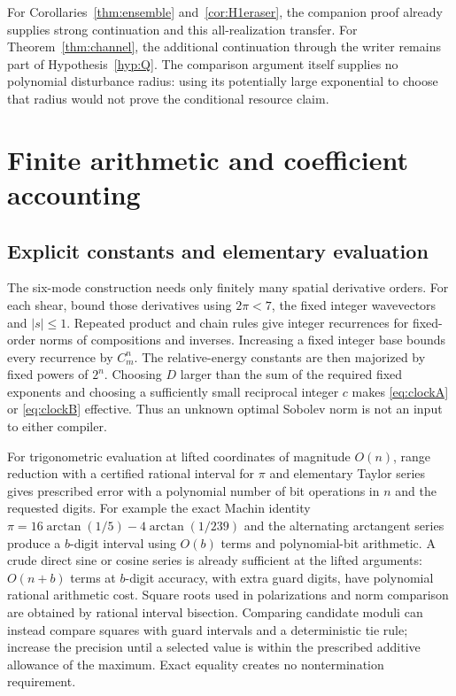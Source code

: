 \documentclass[11pt,a4paper]{amsart}
\theoremstyle{definition}
\theoremstyle{remark}
\numberwithin{equation}{section}
\begin{document}
For Corollaries~\ref{thm:ensemble} and~\ref{cor:H1eraser}, the companion proof already supplies strong continuation and this all-realization transfer. For Theorem~\ref{thm:channel}, the additional continuation through the writer remains part of Hypothesis~\ref{hyp:Q}. The comparison argument itself supplies no polynomial disturbance radius: using its potentially large exponential to choose that radius would not prove the conditional resource claim.



\section{Finite arithmetic and coefficient accounting}\label{app:computation}

\subsection{Explicit constants and elementary evaluation}
The six-mode construction needs only finitely many spatial derivative orders. For each shear, bound those derivatives using $2\pi<7$, the fixed integer wavevectors and $|s|\le1$. Repeated product and chain rules give integer recurrences for fixed-order norms of compositions and inverses. Increasing a fixed integer base bounds every recurrence by $C_m^n$. The relative-energy constants are then majorized by fixed powers of $2^n$. Choosing $D$ larger than the sum of the required fixed exponents and choosing a sufficiently small reciprocal integer $c$ makes \eqref{eq:clockA} or \eqref{eq:clockB} effective. Thus an unknown optimal Sobolev norm is not an input to either compiler.

For trigonometric evaluation at lifted coordinates of magnitude $O(n)$, range reduction with a certified rational interval for $\pi$ and elementary Taylor series gives prescribed error with a polynomial number of bit operations in $n$ and the requested digits. For example the exact Machin identity
$\pi=16\arctan(1/5)-4\arctan(1/239)$ and the alternating arctangent series produce a $b$-digit interval using $O(b)$ terms and polynomial-bit arithmetic. A crude direct sine or cosine series is already sufficient at the lifted arguments: $O(n+b)$ terms at $b$-digit accuracy, with extra guard digits, have polynomial rational arithmetic cost. Square roots used in polarizations and norm comparison are obtained by rational interval bisection. Comparing candidate moduli can instead compare squares with guard intervals and a deterministic tie rule; increase the precision until a selected value is within the prescribed additive allowance of the maximum. Exact equality creates no nontermination requirement.
\end{document}
